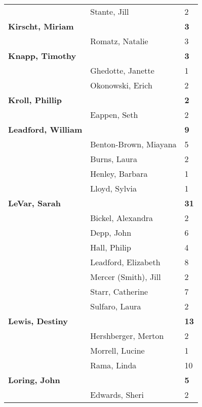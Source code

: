 \documentclass{article}\usepackage[]{graphicx}\usepackage[]{color}
\begin{document}
{\begin{longtable} { >{\raggedright}p{}|p{}p{}}
   \rowcolor[gray]{0.90} & Stante, Jill & 2 \\ 
   \rowcolor[gray]{0.90}\textbf{Kirscht, Miriam} &  & \hspace{2cm}\textbf{3} \\ 
   \rowcolor[gray]{0.90} & Romatz, Natalie & 3 \\ 
  \textbf{Knapp, Timothy} &  & \hspace{2cm}\textbf{3} \\ 
   & Ghedotte, Janette & 1 \\ 
   & Okonowski, Erich & 2 \\ 
   \rowcolor[gray]{0.90}\textbf{Kroll, Phillip} &  & \hspace{2cm}\textbf{2} \\ 
   \rowcolor[gray]{0.90} & Eappen, Seth & 2 \\ 
   \rowcolor[gray]{0.90}\textbf{Leadford, William} &  & \hspace{2cm}\textbf{9} \\ 
   & Benton-Brown, Miayana & 5 \\ 
   & Burns, Laura & 2 \\ 
   & Henley, Barbara & 1 \\ 
   \rowcolor[gray]{0.90} & Lloyd, Sylvia & 1 \\ 
   \rowcolor[gray]{0.90}\textbf{LeVar, Sarah} &  & \hspace{2cm}\textbf{31} \\ 
   \rowcolor[gray]{0.90} & Bickel, Alexandra & 2 \\ 
   & Depp, John & 6 \\ 
   & Hall, Philip & 4 \\ 
   & Leadford, Elizabeth & 8 \\ 
   \rowcolor[gray]{0.90} & Mercer (Smith), Jill & 2 \\ 
   \rowcolor[gray]{0.90} & Starr, Catherine & 7 \\ 
   \rowcolor[gray]{0.90} & Sulfaro, Laura & 2 \\ 
  \textbf{Lewis, Destiny} &  & \hspace{2cm}\textbf{13} \\ 
   & Hershberger, Merton & 2 \\ 
   & Morrell, Lucine & 1 \\ 
   \rowcolor[gray]{0.90} & Rama, Linda & 10 \\ 
   \rowcolor[gray]{0.90}\textbf{Loring, John} &  & \hspace{2cm}\textbf{5} \\ 
   \rowcolor[gray]{0.90} & Edwards, Sheri & 2 \\ 

\end{longtable}}
\end{document}

